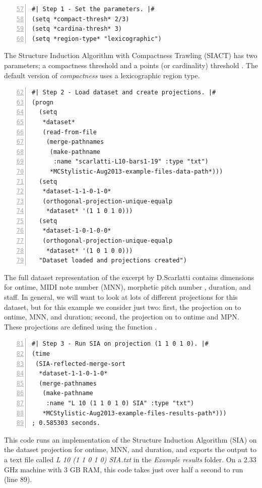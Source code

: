 \begin{Verbatim}[frame=single,numbers=left,firstnumber=57]
#| Step 1 - Set the parameters. |#
(setq *compact-thresh* 2/3)
(setq *cardina-thresh* 3)
(setq *region-type* "lexicographic")
\end{Verbatim}
The Structure Induction Algorithm with Compactness Trawling (SIACT) has two parameters; a compactness threshold and a points (or cardinality) threshold \citep{collins2010b}. The default version of \emph{compactness} uses a lexicographic region type.

\begin{Verbatim}[frame=single,numbers=left,firstnumber=62]
#| Step 2 - Load dataset and create projections. |#
(progn
  (setq
   *dataset*
   (read-from-file
    (merge-pathnames
     (make-pathname
      :name "scarlatti-L10-bars1-19" :type "txt")
     *MCStylistic-Aug2013-example-files-data-path*)))
  (setq
   *dataset-1-1-0-1-0*
   (orthogonal-projection-unique-equalp
    *dataset* '(1 1 0 1 0)))
  (setq
   *dataset-1-0-1-0-0*
   (orthogonal-projection-unique-equalp
    *dataset* '(1 0 1 0 0)))
  "Dataset loaded and projections created")
\end{Verbatim}
The full dataset representation of the excerpt by D.\hspace{0.1cm}Scarlatti contains dimensions for ontime, MIDI note number (MNN), morphetic pitch number \citep*[MPN, for details see Sec.~2.25 of][]{collins2011b}, duration, and staff. In general, we will want to look at lots of different projections for this dataset, but for this example we consider just two: first, the projection on to ontime, MNN, and duration; second, the projection on to ontime and MPN. These projections are defined using the function .

\begin{Verbatim}[frame=single,numbers=left,firstnumber=81]
#| Step 3 - Run SIA on projection (1 1 0 1 0). |#
(time
 (SIA-reflected-merge-sort
  *dataset-1-1-0-1-0*
  (merge-pathnames
   (make-pathname
    :name "L 10 (1 1 0 1 0) SIA" :type "txt")
   *MCStylistic-Aug2013-example-files-results-path*)))
; 0.585303 seconds.
\end{Verbatim}
This code runs an implementation of the Structure Induction Algorithm (SIA) on the dataset projection for ontime, MNN, and duration, and exports the output to a text file called \emph{L 10 (1 1 0 1 0) SIA.txt} in the \emph{Example results} folder. On a 2.33 GHz machine with 3 GB RAM, this code takes just over half a second to run (line 89).

